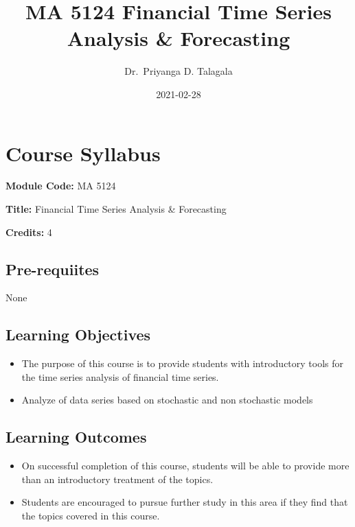 \documentclass[]{book}
\title{MA 5124 Financial Time Series Analysis \& Forecasting}
\author{Dr.~Priyanga D. Talagala}
\date{2021-02-28}
\providecommand{\tightlist}{%
  \setlength{\itemsep}{0pt}\setlength{\parskip}{0pt}}
\begin{document}
\maketitle

{
\setcounter{tocdepth}{1}
\tableofcontents
}
\hypertarget{course-syllabus}{%
\chapter*{Course Syllabus}\label{course-syllabus}}


\textbf{Module Code:} MA 5124

\textbf{Title:} Financial Time Series Analysis \& Forecasting

\textbf{Credits:} 4

\hypertarget{pre-requiites}{%
\section*{Pre-requiites}\label{pre-requiites}}

None

\hypertarget{learning-objectives}{%
\section*{Learning Objectives}\label{learning-objectives}}

\begin{itemize}
\tightlist
\item
  The purpose of this course is to provide students with introductory tools for the time series analysis of financial time series.
\item
  Analyze of data series based on stochastic and non stochastic models
\end{itemize}

\hypertarget{learning-outcomes}{%
\section*{Learning Outcomes}\label{learning-outcomes}}

\begin{itemize}
\tightlist
\item
  On successful completion of this course, students will be able to provide more than an introductory treatment of the topics.
\item
  Students are encouraged to pursue further study in this area if they find that the topics covered in this course.
\end{itemize}
\end{document}
